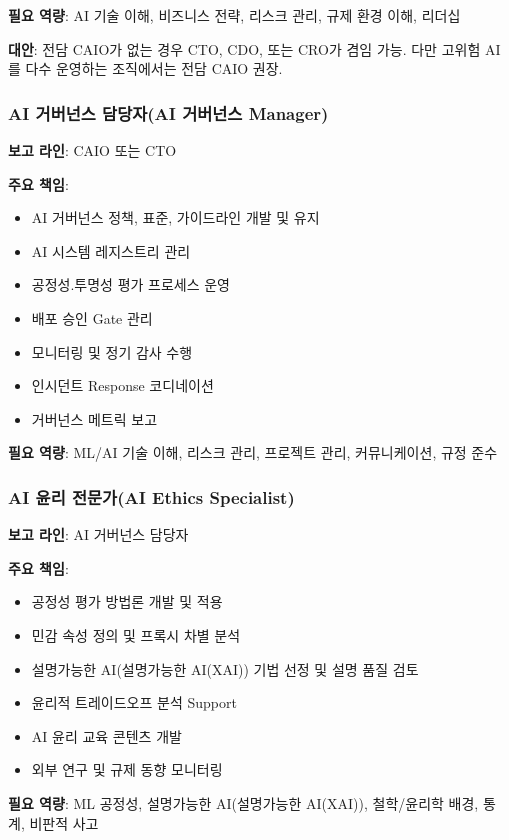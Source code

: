\textbf{필요 역량}: 
AI 기술 이해, 비즈니스 전략, 리스크 관리, 규제 환경 이해, 리더십

\textbf{대안}: 
전담 CAIO가 없는 경우 CTO, CDO, 또는 CRO가 겸임 가능. 
다만 고위험 AI를 다수 운영하는 조직에서는 전담 CAIO 권장.


\subsubsection{AI 거버넌스 담당자(AI 거버넌스 Manager)}

\textbf{보고 라인}: CAIO 또는 CTO

\textbf{주요 책임}:
\begin{itemize}
 \item AI 거버넌스 정책, 표준, 가이드라인 개발 및 유지
 \item AI 시스템 레지스트리 관리
 \item 공정성.투명성\cite{arrieta2020explainable} 평가 프로세스 운영
 \item 배포 승인 Gate 관리
 \item 모니터링 및 정기 감사 수행
 \item 인시던트 Response 코디네이션
 \item 거버넌스 메트릭 보고
\end{itemize}

\textbf{필요 역량}: 
ML/AI 기술 이해, 리스크 관리, 프로젝트 관리, 커뮤니케이션, 규정 준수


\subsubsection{AI 윤리 전문가(AI Ethics Specialist)}

\textbf{보고 라인}: AI 거버넌스 담당자

\textbf{주요 책임}:
\begin{itemize}
 \item 공정성 평가 방법론 개발 및 적용
 \item 민감 속성 정의 및 프록시 차별 분석
 \item 설명가능한 AI(설명가능한 AI(XAI)) 기법 선정 및 설명 품질 검토
 \item 윤리적 트레이드오프 분석 Support
 \item AI 윤리 교육 콘텐츠 개발
 \item 외부 연구 및 규제 동향 모니터링
\end{itemize}

\textbf{필요 역량}: 
ML 공정성, 설명가능한 AI(설명가능한 AI(XAI)), 철학/윤리학 배경, 통계, 비판적 사고



